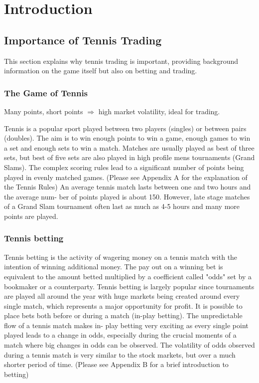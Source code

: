 \documentclass[10pt]{report}
\begin{document}
\tableofcontents

\chapter{Introduction}

\section{Importance of Tennis Trading}

This section explains why tennis trading is important, providing background information on the game itself but also on betting and trading.

\subsection{The Game of Tennis }

Many points, short points $\Rightarrow$ high market volatility, ideal for trading.

Tennis is a popular sport played between two players (singles) or between pairs
(doubles). The aim is to win enough points to win a game, enough games to win
a set and enough sets to win a match. Matches are usually played as best of three
sets, but best of five sets are also played in high profile mens tournaments (Grand
Slams). The complex scoring rules lead to a significant number of points being
played in evenly matched games. (Please see Appendix A for the explanation of the Tennis Rules)
An average tennis match lasts between one and two hours and the average num-
ber of points played is about 150. However, late stage matches of a Grand Slam
tournament often last as much as 4-5 hours and many more points are played.


\subsection{Tennis betting}

Tennis betting is the activity of wagering money on a tennis match with the intention of winning additional money.
The pay out on a winning bet is equivalent to the amount betted multiplied by a coefficient called "odds" set by a bookmaker or a 
counterparty.
Tennis betting is largely popular since tournaments are played all around the year
with huge markets being created around every single match, which represents a
major opportunity for profit. It is possible to place bets both before or during
a match (in-play betting). The unpredictable flow of a tennis match makes in-
play betting very exciting as every single point played leads to a change in odds,
especially during the crucial moments of a match where big changes in odds can be
observed. The volatility of odds observed during a tennis match is very similar to
the stock markets, but over a much shorter period of time.
(Please see Appendix B for a brief introduction to betting)
\end{document}

